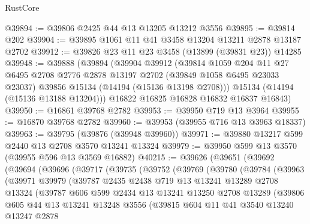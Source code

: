 \begin{lexlean}{RustCore}
\begin{coremodule}
@39894 := @39806 @2425 @44 @13 @13205 @13212 @3556
@39895 := @39814 @202
@39904 := @39895 @1061 @11 @41 @3458 @13204 @13211 @2878 @13187 @2702
@39912 := @39826 @23 @11 @23 @3458 (@13899 (@39831 @23)) @14285
@39948 := @39888
    (@39894
      (@39904
        @39912
        (@39814
          @1059
          @204
          @11
          @27
          @6495
          @2708
          @2776
          @2878
          @13197
          @2702
          (@39849 @1058 @6495 @23033 @23037)
          @39856
          @15134
          (@14194 (@15136 @13198 @2708)))
        @15134
        (@14194 (@15136 @13188 @13204)))
      @16822
      @16825
      @16828
      @16832
      @16837
      @16843)
@39950 := @16861 @39768 @2782
@39953 := @39950 @719 @13 @3964
@39955 := @16870 @39768 @2782
@39960 := @39953 (@39955 @716 @13 @3963 @18337)
@39963 := @39795 (@39876 (@39948 @39960))
@39971 := @39880 @13217 @599 @2440 @13 @2708 @3570 @13241 @13324
@39979 := @39950 @599 @13 @3570 (@39955 @596 @13 @3569 @16882)
@40215 := @39626
    (@39651
      (@39692
        (@39694
          (@39696
            (@39717
              (@39735
                (@39752
                  (@39769
                    (@39780
                      (@39784
                        (@39963
                          (@39971
                            @39979
                            (@39787
                              @2435
                              @2438
                              @719
                              @13
                              @13241
                              @13289
                              @2708
                              @13324
                              (@39787
                                @606
                                @599
                                @2434
                                @13
                                @13241
                                @13250
                                @2708
                                @13289
                                (@39806
                                  @605
                                  @44
                                  @13
                                  @13241
                                  @13248
                                  @3556
                                  (@39815
                                    @604
                                    @11
                                    @41
                                    @3540
                                    @13240
                                    @13247
                                    @2878

\end{coremodule}
\end{lexlean}
